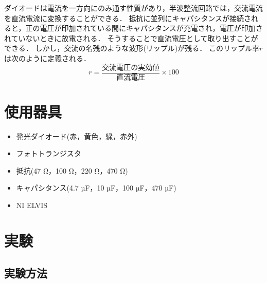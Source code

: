 \documentclass{ltjsarticle}
\begin{document}
ダイオードは電流を一方向にのみ通す性質があり，半波整流回路では，交流電流を直流電流に変換することができる．
抵抗に並列にキャパシタンスが接続されると，正の電圧が印加されている間にキャパシタンスが充電され，電圧が印加されていないときに放電される．
そうすることで直流電圧として取り出すことができる．
しかし，交流の名残のような波形(リップル)が残る．
このリップル率${r}$は次のように定義される．
\begin{equation}
  r = \frac{{\text{交流電圧の実効値}}}{{\text{直流電圧}}} \times 100
\end{equation}

\section{使用器具}
\begin{itemize}
  \item 発光ダイオード(赤，黄色，緑，赤外)
  \item フォトトランジスタ
  \item 抵抗(47 Ω，100 Ω，220 Ω，470 Ω)
  \item キャパシタンス(4.7 µF，10 µF，100 µF，470 µF)
  \item NI ELVIS
\end{itemize}

\section{実験}
\subsection{実験方法}
\end{document}

